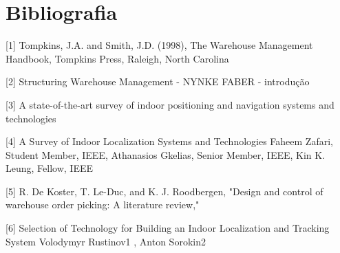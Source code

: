 \documentclass[]{politex}
\begin{document}
\part{Bibliografia}
[1] Tompkins, J.A. and Smith, J.D. (1998), The Warehouse Management Handbook,
Tompkins Press, Raleigh, North Carolina

[2] Structuring Warehouse
Management - NYNKE FABER - introdução

[3] A state-of-the-art survey of indoor
positioning and navigation systems and
technologies

[4] A Survey of Indoor Localization Systems and
Technologies
Faheem Zafari, Student Member, IEEE, Athanasios Gkelias, Senior Member, IEEE,
Kin K. Leung, Fellow, IEEE

[5] R. De Koster, T. Le-Duc, and K. J. Roodbergen, "Design and control
of warehouse order picking: A literature review," 

[6] Selection of Technology for Building an Indoor
Localization and Tracking System
Volodymyr Rustinov1
, Anton Sorokin2 
\end{document}

